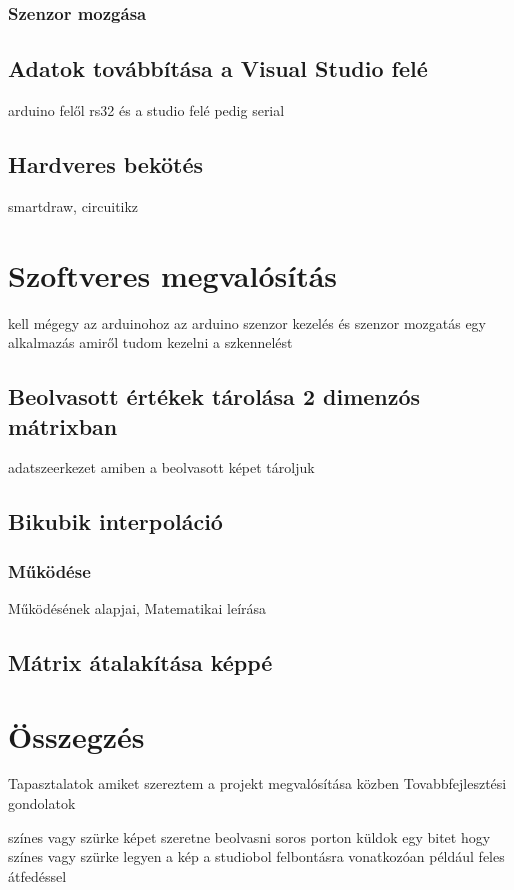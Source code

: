 \documentclass[]{thesis-ekf}
\theoremstyle{definition}
\theoremstyle{remark}
\begin{document}
\subsection{Szenzor mozgása}
\section{Adatok továbbítása a Visual Studio felé}
arduino felől rs32 és a studio felé pedig serial
\section{Hardveres bekötés}
smartdraw, circuitikz
\chapter{Szoftveres megvalósítás}
kell mégegy az arduinohoz az arduino szenzor kezelés és szenzor mozgatás
egy alkalmazás amiről tudom kezelni a szkennelést
\section{Beolvasott értékek tárolása 2 dimenzós mátrixban}
adatszeerkezet amiben a beolvasott képet tároljuk
\section{Bikubik interpoláció}
\subsection{Működése}
Működésének alapjai, Matematikai leírása
\section{Mátrix átalakítása képpé}



\chapter*{Összegzés}
Tapasztalatok amiket szereztem a projekt megvalósítása közben
Tovabbfejlesztési gondolatok

színes vagy szürke képet szeretne beolvasni
soros porton küldok egy bitet hogy színes vagy szürke legyen a kép a studiobol
felbontásra vonatkozóan például  feles átfedéssel 
\end{document}
